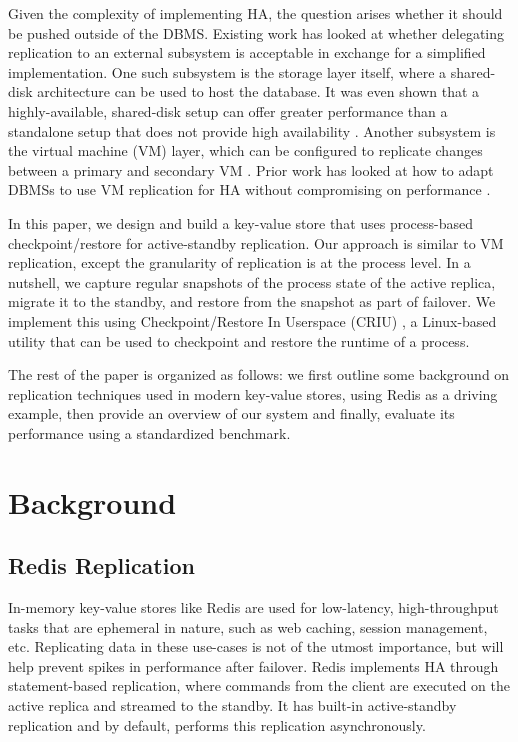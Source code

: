 \documentclass[final]{proc}
\begin{document}
Given the complexity of implementing HA, the question arises whether it should
be pushed outside of the DBMS. Existing work has looked at whether delegating
replication to an external subsystem is acceptable in exchange for a simplified
implementation. One such subsystem is the storage layer itself, where a
shared-disk architecture can be used to host the database. It was even shown
that a highly-available, shared-disk setup can offer greater performance than a
standalone setup that does not provide high availability \cite{SHADOW}. Another
subsystem is the virtual machine (VM) layer, which can be configured to
replicate changes between a primary and secondary VM \cite{Hypervisor, Remus,
Scales2010TheDA}. Prior work has looked at how to adapt DBMSs to use VM
replication for HA without compromising on performance \cite{RemusDB}.

In this paper, we design and build a key-value store that uses process-based
checkpoint/restore for active-standby replication. Our approach is similar to VM
replication, except the granularity of replication is at the process level. In a
nutshell, we capture regular snapshots of the process state of the active
replica, migrate it to the standby, and restore from the snapshot as part of
failover. We implement this using Checkpoint/Restore In Userspace (CRIU)
\cite{CRIU}, a Linux-based utility that can be used to checkpoint and restore
the runtime of a process.

The rest of the paper is organized as follows: we first outline some background
on replication techniques used in modern key-value stores, using Redis
\cite{Redis} as a driving example, then provide an overview of our system and
finally, evaluate its performance using a standardized benchmark.

\section{Background}

\subsection{Redis Replication}

In-memory key-value stores like Redis are used for low-latency, high-throughput
tasks that are ephemeral in nature, such as web caching, session management,
etc. Replicating data in these use-cases is not of the utmost importance, but
will help prevent spikes in performance after failover. Redis implements HA
through statement-based replication, where commands from the client are executed
on the active replica and streamed to the standby. It has built-in
active-standby replication and by default, performs this replication
asynchronously.
\end{document}
